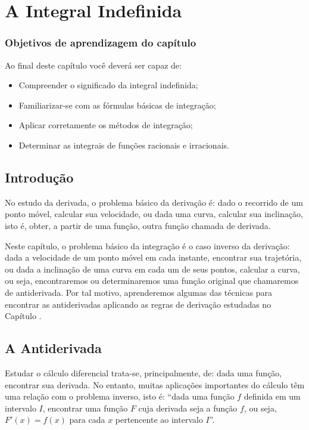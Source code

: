 \cleardoublepage\documentclass[../main.tex]{subfiles}
\begin{document}
\chapter{A Integral Indefinida}\label{cap:IntIndefinida}
\minitoc
\subsection*{Objetivos de aprendizagem do capítulo}
\noindent Ao final deste capítulo você deverá ser capaz de:
\begin{itemize}
    \item Compreender o significado da integral indefinida;
    \item  Familiarizar-se com as fórmulas básicas de integração;
    \item Aplicar corretamente os métodos de integração;
    \item  Determinar as integrais de funções racionais e irracionais.
\end{itemize}

\section{Introdução}
No estudo da derivada, o problema básico da derivação é: dado o recorrido de um ponto móvel, calcular sua velocidade, ou dada uma curva, calcular sua inclinação, isto é, obter, a partir de uma função, outra função chamada de derivada.

Neste capítulo, o problema básico da integração é o caso inverso da derivação: dada a velocidade de um ponto móvel em cada instante, encontrar sua trajetória, ou dada a inclinação de uma curva em cada um de seus pontos, calcular a curva, ou seja, encontraremos ou determinaremos uma função original que chamaremos de antiderivada. Por tal motivo, aprenderemos algumas das técnicas para encontrar as antiderivadas aplicando as regras de derivação estudadas no Capítulo .
\section{A Antiderivada}\label{Cap:IntInd-sec:Antiderivada}
Estudar o cálculo diferencial trata-se, principalmente, de: dada uma função, encontrar sua derivada. No entanto, muitas aplicações importantes do cálculo têm uma relação com o problema inverso, isto é: ``dada uma função \(f\) definida em um intervalo \(I\), encontrar uma função \(F\) cuja derivada seja a função \(f\), ou seja, \(F'(x)=f(x)\) para cada \(x\) pertencente ao intervalo \(I\)''.
\end{document}
